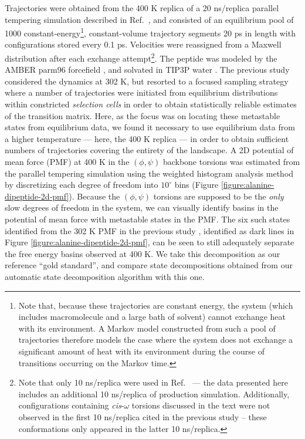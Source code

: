 Trajectories were obtained from the 400 K replica of a 20 ns/replica parallel tempering simulation described in Ref.\ \cite{chodera:mms:2006}, and consisted of an equilibrium pool of 1000 constant-energy\footnote{Note that, because these trajectories are constant energy, the system (which includes macromolecule and a large bath of solvent) cannot exchange heat with its environment.  A Markov model constructed from such a pool of trajectories therefore models the case where the system does not exchange a significant amount of heat with its environment during the course of transitions occurring on the Markov time.}, constant-volume trajectory segments 20 ps in length with configurations stored every 0.1 ps.
Velocities were reassigned from a Maxwell distribution after each exchange attempt\footnote{Note that only 10 ns/replica were used in Ref.\ \cite{chodera:mms:2006} --- the data presented here includes an additional 10 ns/replica of production simulation.  Additionally, configurations containing \emph{cis}-$\omega$ torsions discussed in the text were not observed in the first 10 ns/replica cited in the previous study -- these conformations only appeared in the latter 10 ns/replica.}.
The peptide was modeled by the AMBER parm96 forcefield \cite{AMBER-parm96}, and solvated in TIP3P water \cite{jorgensen:1983a}.
The previous study \cite{chodera:mms:2006} considered the dynamics at 302 K, but resorted to a focused sampling strategy where a number of trajectories were initiated from equilibrium distributions within constricted \emph{selection cells} \cite{swope:2004a} in order to obtain statistically reliable estimates of the transition matrix.
Here, as the focus was on locating these metastable states from equilibrium data, we found it necessary to use equilibrium data from a higher temperature --- here, the 400 K replica --- in order to obtain sufficient numbers of trajectories covering the entirety of the landscape.
A 2D potential of mean force (PMF) at 400 K in the $(\phi,\psi)$ backbone torsions was estimated from the parallel tempering simulation using the weighted histogram analysis method \cite{kumar:1992a,chodera:jctc:2006} by discretizing each degree of freedom into $10^\circ$ bins (Figure \ref{figure:alanine-dipeptide-2d-pmf}).
Because the $(\phi,\psi)$ torsions are supposed to be the \emph{only} slow degrees of freedom in the system, we can visually identify basins in the potential of mean force with metastable states in the PMF.
The six such states identified from the 302 K PMF in the previous study \cite{chodera:mms:2006}, identified as dark lines in Figure \ref{figure:alanine-dipeptide-2d-pmf}, can be seen to still adequately separate the free energy basins observed at 400 K.
We take this decomposition as our reference ``gold standard'', and compare state decompositions obtained from our automatic state decomposition algorithm with this one.

